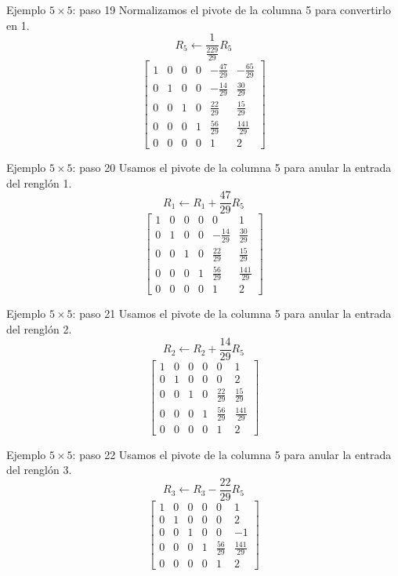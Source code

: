 \documentclass[aspectratio=169,9pt]{beamer}
\theoremstyle{remark}
\begin{document}
\begin{frame}[t]{Ejemplo $5\times5$: paso 19}
Normalizamos el pivote de la columna 5 para convertirlo en 1.
\[
R_{5}\leftarrow \frac{1}{\frac{229}{29}}R_{5}
\]
\[
\left[\begin{array}{ccccc|c}
1 & 0 & 0 & 0 & - \frac{47}{29} & - \frac{65}{29}\\
0 & 1 & 0 & 0 & - \frac{14}{29} & \frac{30}{29}\\
0 & 0 & 1 & 0 & \frac{22}{29} & \frac{15}{29}\\
0 & 0 & 0 & 1 & \frac{56}{29} & \frac{141}{29}\\
0 & 0 & 0 & 0 & 1 & 2
\end{array}\right]
\]
\end{frame}
\begin{frame}[t]{Ejemplo $5\times5$: paso 20}
Usamos el pivote de la columna 5 para anular la entrada del renglón 1.
\[
R_{1}\leftarrow R_{1}+\frac{47}{29}R_{5}
\]
\[
\left[\begin{array}{ccccc|c}
1 & 0 & 0 & 0 & 0 & 1\\
0 & 1 & 0 & 0 & - \frac{14}{29} & \frac{30}{29}\\
0 & 0 & 1 & 0 & \frac{22}{29} & \frac{15}{29}\\
0 & 0 & 0 & 1 & \frac{56}{29} & \frac{141}{29}\\
0 & 0 & 0 & 0 & 1 & 2
\end{array}\right]
\]
\end{frame}
\begin{frame}[t]{Ejemplo $5\times5$: paso 21}
Usamos el pivote de la columna 5 para anular la entrada del renglón 2.
\[
R_{2}\leftarrow R_{2}+\frac{14}{29}R_{5}
\]
\[
\left[\begin{array}{ccccc|c}
1 & 0 & 0 & 0 & 0 & 1\\
0 & 1 & 0 & 0 & 0 & 2\\
0 & 0 & 1 & 0 & \frac{22}{29} & \frac{15}{29}\\
0 & 0 & 0 & 1 & \frac{56}{29} & \frac{141}{29}\\
0 & 0 & 0 & 0 & 1 & 2
\end{array}\right]
\]
\end{frame}
\begin{frame}[t]{Ejemplo $5\times5$: paso 22}
Usamos el pivote de la columna 5 para anular la entrada del renglón 3.
\[
R_{3}\leftarrow R_{3}-\frac{22}{29}R_{5}
\]
\[
\left[\begin{array}{ccccc|c}
1 & 0 & 0 & 0 & 0 & 1\\
0 & 1 & 0 & 0 & 0 & 2\\
0 & 0 & 1 & 0 & 0 & -1\\
0 & 0 & 0 & 1 & \frac{56}{29} & \frac{141}{29}\\
0 & 0 & 0 & 0 & 1 & 2
\end{array}\right]
\]
\end{frame}
\end{document}
